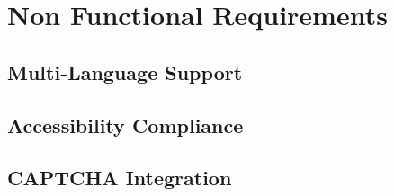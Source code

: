 \section{Non Functional Requirements}

\subsection{Multi-Language Support}




\subsection{Accessibility Compliance}






\subsection{CAPTCHA Integration}

